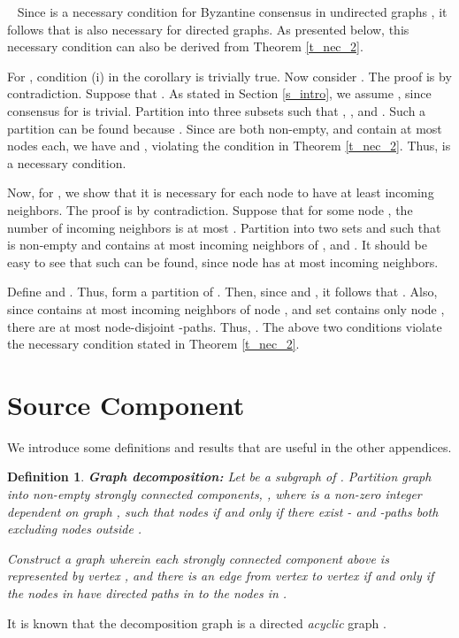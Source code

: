\documentclass[letterpaper, 11pt]{article}
\newenvironment{proof}{\noindent {\bf Proof:}~}{\hspace*{\fill}}
\newtheorem{definition}{Definition}
\begin{document}
\begin{proof}
Since  is a necessary condition for Byzantine consensus in
undirected graphs \cite{impossible_proof_lynch, welch_book}, it follows that  is also necessary for directed graphs.  As presented below, this necessary condition can also be derived from Theorem \ref{t_nec_2}.

For , condition (i) in the corollary is trivially true.
Now consider .
 The proof is by contradiction. Suppose that .
As stated in Section \ref{s_intro}, we assume , since consensus for  is trivial.
Partition  into three subsets  such that ,
, and . Such a partition can be found because
. 
Since  are both non-empty, and contain at most  nodes each, we have 
 and , violating the condition in Theorem \ref{t_nec_2}.
Thus,  is a necessary condition.

Now, for , we show that it is necessary for each node to have at least  incoming neighbors. The proof is by contradiction.
Suppose that for some node , the number of incoming neighbors
is at most . Partition  into two sets  and 
such that  is non-empty and contains at most  incoming neighbors of ,
and . It should be easy to see that such  can be found, since node  has at most  incoming neighbors.

Define  and .
Thus,  form a partition of .
Then, since  and , it follows that .
Also, since  contains at most  incoming neighbors of node , and
set  contains only node , there are at most  node-disjoint -paths. Thus, . The above two conditions violate the necessary condition stated in Theorem \ref{t_nec_2}. 
\end{proof}





\section{Source Component}
\label{a_SC}


We introduce some definitions and results that are useful in the other appendices.


\begin{definition}
\label{def:decompose}
{\bf Graph decomposition:}
Let  be a subgraph of . Partition graph  into non-empty strongly connected components,
 , where  is a non-zero integer dependent on graph ,
 such that nodes  if and only if
there exist - and -paths both excluding nodes outside .

Construct a graph  wherein each strongly connected component  above is represented by vertex , and there is an edge from vertex  to vertex  if and only if the nodes in  have directed paths in  to the nodes in .
\end{definition}
It is known that the decomposition graph  is a directed {\em acyclic} graph \cite{dag_decomposition}.
\end{document}
